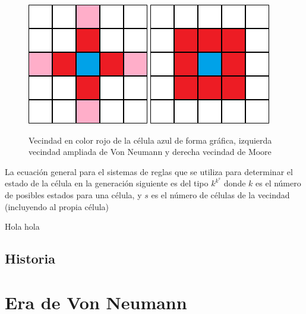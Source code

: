 \begin{figure}[H]
\centering
\includegraphics[scale=0.5]{imagenes/CA_Neumann.png}
\hspace{2cm}
\includegraphics[scale=0.5]{imagenes/CA-Moore.png}
\caption{Vecindad en color rojo de la célula azul de forma gráfica, izquierda vecindad ampliada de Von Neumann y derecha vecindad de Moore}
\label{fig:vecindad}

\end{figure}

La ecuación general para el sistemas de reglas que se utiliza para determinar el estado de la célula en la generación siguiente es del tipo $k^{k^s}$ donde $k$ es el número de posibles estados para una célula, y $s$ es el número de células de la vecindad (incluyendo al propia célula) 

Hola \cite{Teoria_von_neumann} hola
\subsection{Historia}



\section{Era de Von Neumann} %

